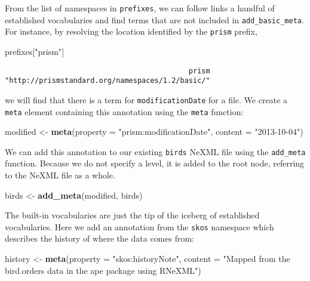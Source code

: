 \documentclass[author-year, review, 11pt]{components/elsarticle} %
\newenvironment{Shaded}{\begin{snugshade}}{\end{snugshade}}
\newcommand{\KeywordTok}[1]{\textcolor[rgb]{0.13,0.29,0.53}{\textbf{{#1}}}}
\newcommand{\DataTypeTok}[1]{\textcolor[rgb]{0.13,0.29,0.53}{{#1}}}
\newcommand{\StringTok}[1]{\textcolor[rgb]{0.31,0.60,0.02}{{#1}}}
\newcommand{\NormalTok}[1]{{#1}}
\begin{document}
From the list of namespaces in \texttt{prefixes}, we can follow links a
handful of established vocabularies and find terms that are not included
in \texttt{add\_basic\_meta}. For instance, by resolving the location
identified by the \texttt{prism} prefix,

\begin{Shaded}
\begin{Highlighting}[]
\NormalTok{prefixes[}\StringTok{"prism"}\NormalTok{]}
\end{Highlighting}
\end{Shaded}

\begin{verbatim}
                                           prism 
"http://prismstandard.org/namespaces/1.2/basic/" 
\end{verbatim}

we will find that there is a term for \texttt{modificationDate} for a
file. We create a \texttt{meta} element containing this annotation using
the \texttt{meta} function:

\begin{Shaded}
\begin{Highlighting}[]
\NormalTok{modified <-}\StringTok{ }\KeywordTok{meta}\NormalTok{(}\DataTypeTok{property =} \StringTok{"prism:modificationDate"}\NormalTok{, }\DataTypeTok{content =} \StringTok{"2013-10-04"}\NormalTok{)}
\end{Highlighting}
\end{Shaded}

We can add this annotation to our existing \texttt{birds} NeXML file
using the \texttt{add\_meta} function. Because we do not specify a
level, it is added to the root node, referring to the NeXML file as a
whole.

\begin{Shaded}
\begin{Highlighting}[]
\NormalTok{birds <-}\StringTok{ }\KeywordTok{add_meta}\NormalTok{(modified, birds) }
\end{Highlighting}
\end{Shaded}

The built-in vocabularies are just the tip of the iceberg of established
vocabularies. Here we add an annotation from the \texttt{skos} namespace
which describes the history of where the data comes from:

\begin{Shaded}
\begin{Highlighting}[]
\NormalTok{history <-}\StringTok{ }\KeywordTok{meta}\NormalTok{(}\DataTypeTok{property =} \StringTok{"skos:historyNote"}\NormalTok{,}
  \DataTypeTok{content =} \StringTok{"Mapped from the bird.orders data in the ape package using RNeXML"}\NormalTok{)}
\end{Highlighting}
\end{Shaded}
\end{document}
